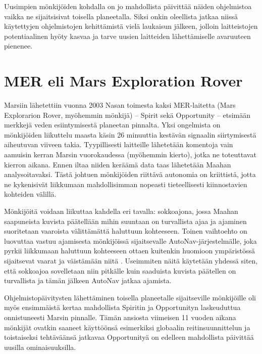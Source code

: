 \documentclass[finnish]{tktltiki2}
\theoremstyle{definition}
\theoremstyle{remark}
\begin{document}
Uusimpien mönkijöiden kohdalla on jo mahdollista päivittää näiden ohjelmistoa vaikka ne sijaitsisivat toisella planeetalla. Siksi onkin oleellista jatkaa niissä käytettyjen ohjelmistojen kehittämistä vielä laukaisun jälkeen, jolloin laitteistojen potentiaalinen hyöty kasvaa ja tarve uusien laitteiden lähettämiselle avaruuteen pienenee.

\section{MER eli Mars Exploration Rover}
Marsiin lähetettiin vuonna 2003 Nasan toimesta kaksi MER-laitetta (Mars Explorarion Rover, myöhemmin mönkijä) – Spirit sekä Opportunity – etsimään merkkejä veden esiintymisestä planeetan pinnalta. Yksi ongelmista on mönkijöiden liikuttelu maasta käsin 26 minuuttia kestävän signaalin siirtymisestä aiheutuvan viiveen takia. Tyypillisesti laitteille lähetetään komentoja vain aamuisin kerran Marsin vuorokaudessa (myöhemmin kierto), jotka ne toteuttavat kierron aikana. Ennen iltaa niiden keräämä data taas lähetetään Maahan analysoitavaksi. Tästä johtuen mönkijöiden riittävä autonomia on kriittistä, jotta ne kykenisivät liikkumaan mahdollisimman nopeasti tieteellisesti kiinnostavien kohteiden välillä.

Mönkijöitä voidaan liikuttaa kahdella eri tavalla: sokkoajona, jossa Maahan saapuneista kuvista päätellään mihin suuntaan on turvallista ajaa ja ajaminen suoritetaan vaaroista välittämättä haluttuun kohteeseen. Toinen vaihtoehto on luovuttaa vastuu ajamisesta mönkijöissä sijaitsevalle AutoNav-järjestelmälle, joka pyrkii liikkumaan haluttuun kohteeseen ottaen kuitenkin huomioon ympäristössä sijaitsevat vaarat ja väistämään niitä \cite{marsjuttuja}. Useimmiten näitä käytetään yhdessä siten, että sokkoajoa sovelletaan niin pitkälle kuin saaduista kuvista päätellen on turvallista ja tämän jälkeen AutoNav jatkaa ajamista.

Ohjelmistopäivitysten lähettäminen toisella planeetalle sijaitseville mönkijöille oli myös ensimmäistä kertaa mahdollista Spiritin ja Opportunityn laskeuduttua onnistuneesti Marsin pinnalle. Tämän ansiosta viimeisen 11 vuoden aikana mönkijät ovatkin saaneet käyttöönsä esimerkiksi globaalin reitinsuunnittelun ja toistaiseksi tehtäväänsä jatkavaa Opportunityä on edelleen mahdollista päivittää uusilla ominaisuuksilla.
\end{document}
